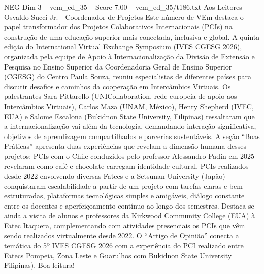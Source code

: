 \begin{textsample}{NEG Dim 3 – vem\_ed\_35 – Score 7.00 – vem\_ed\_35/t186.txt}  \label{ex:f3_neg_136}
Aos Leitores Osvaldo Succi Jr. - Coordenador de Projetos Este número de VEm destaca o papel transformador dos Projetos Colaborativos Internacionais (PCIs) na construção de uma educação superior mais conectada, inclusiva e global.
A quinta edição do International Virtual Exchange Symposium (IVES CGESG 2026), organizada pela equipe de Apoio à Internacionalização da Divisão de Extensão e Pesquisa no Ensino Superior da Coordenadoria Geral de Ensino Superior (CGESG) do Centro Paula Souza, reuniu especialistas de diferentes países para discutir desafios e caminhos da cooperação em Intercâmbios Virtuais.
Os palestrantes Sara Pittarello (UNICollaboration, rede europeia de apoio aos Intercâmbios Virtuais), Carlos Maza (UNAM, México), Henry Shepherd (IVEC, EUA) e Salome Escalona (Bukidnon State University, Filipinas) ressaltaram que a internacionalização vai além da tecnologia, demandando interação significativa, objetivos de aprendizagem compartilhados e parcerias sustentáveis.
A seção “Boas Práticas” apresenta duas experiências que revelam a dimensão humana desses projetos: PCIs com o Chile conduzidos pelo professor Alessandro Padin em 2025 revelaram como café e chocolate carregam identidade cultural.
PCIs realizados desde 2022 envolvendo diversas Fatecs e a Setsunan University (Japão) conquistaram escalabilidade a partir de um projeto com tarefas claras e bem-estruturadas, plataformas tecnológicas simples e amigáveis, diálogo constante entre os docentes e aperfeiçoamento contínuo ao longo dos semestres.
Destaca-se ainda a visita de alunos e professores da Kirkwood Community College (EUA) à Fatec Itaquera, complementando com atividades presenciais os PCIs que vêm sendo realizados virtualmente desde 2022.
O “Artigo de Opinião” conecta a temática do 5º IVES CGESG 2026 com a experiência do PCI realizado entre Fatecs Pompeia, Zona Leste e Guarulhos com Bukidnon State University Filipinas).
Boa leitura!

\end{textsample}
